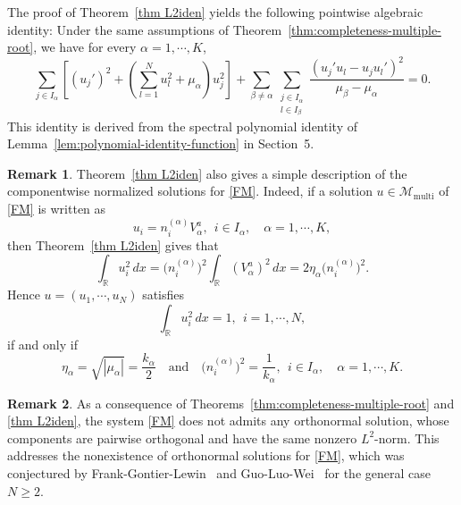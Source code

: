 \documentclass[11pt]{article}
\numberwithin{equation}{section}
\theoremstyle{definition}
\newtheorem{remark}{Remark}[section]
\begin{document}


The proof of Theorem~\ref{thm L2iden} yields the
following pointwise algebraic identity: Under the same assumptions of
Theorem~\ref{thm:completeness-multiple-root}, we have for every
\(\alpha=1,\cdots,K\),
\begin{equation*}
	\sum_{j\in I_\alpha}
	\left[
	(u_j')^2+
	\left(\sum_{l=1}^N u_l^2+\mu_\alpha\right)u_j^2
	\right]
	+
	\sum_{\beta\neq\alpha}
	\sum_{\substack{j\in I_\alpha\\ l\in I_\beta}}
	\frac{(u_j'u_l-u_ju_l')^2}{\mu_\beta-\mu_\alpha}
	=0 .
\end{equation*}
This identity is derived from the spectral polynomial identity of
Lemma~\ref{lem:polynomial-identity-function} in Section~5.
%

\begin{remark}\label{rem:normalized-solutions}
Theorem~\ref{thm L2iden} also gives a simple description of the
componentwise normalized solutions for \eqref{FM}. Indeed, if a solution
\(u\in\mathcal M_{\mathrm{multi}}\) of \eqref{FM} is written as
\[
u_i=n_i^{(\alpha)}V_\alpha^a,
\ \  i\in I_\alpha,\quad \alpha=1,\cdots,K,
\]
then Theorem~\ref{thm L2iden} gives that
\[
\int_{\mathbb R}u_i^2\,dx
=
\bigl(n_i^{(\alpha)}\bigr)^2
\int_{\mathbb R}(V_\alpha^a)^2\,dx
=
2\eta_\alpha \bigl(n_i^{(\alpha)}\bigr)^2 .
\]
Hence \(u=(u_1,\cdots,u_N)\) satisfies
\[
\int_{\mathbb R}u_i^2\,dx=1,
\ \  i=1,\cdots,N,
\]
if and only if
\[
\eta_\alpha=\sqrt{|\mu_\alpha|}=\frac{k_\alpha}{2}
\quad\text{and}\quad
\bigl(n_i^{(\alpha)}\bigr)^2=\frac1{k_\alpha},
\ \  i\in I_\alpha,\quad \alpha=1,\cdots,K .
\]
\end{remark}

\begin{remark}
As a consequence of Theorems~\ref{thm:completeness-multiple-root} and
\ref{thm L2iden}, the system \eqref{FM} does not admits any orthonormal solution, whose components
are pairwise orthogonal and have the same nonzero \(L^2\)-norm. This addresses the nonexistence of orthonormal solutions for \eqref{FM}, which was conjectured %
by Frank-Gontier-Lewin~\cite[page 1793]{Lewin} and
 Guo-Luo-Wei~\cite[Conjecture~5.2]{GLW2026} for the general case \(N\ge 2\).
 \end{remark}
\end{document}
